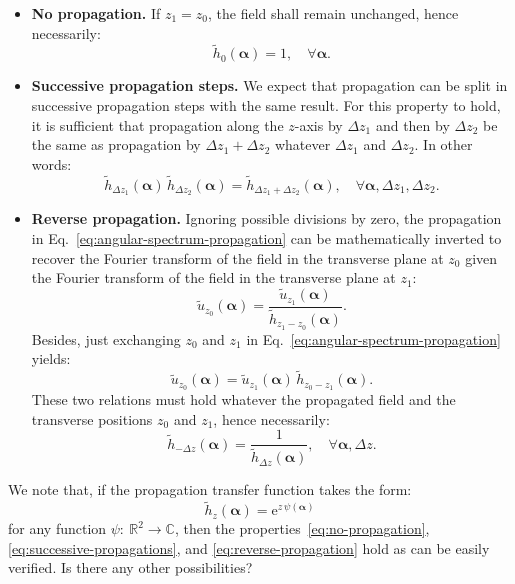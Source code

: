 \documentclass[a4paper]{article}
\newcommand{\oops}[1]{{\color{purple}#1}}
\newcommand{\V}[1]{\boldsymbol{#1}}
\newcommand*{\from}{{:}\:}
\newcommand*{\mathe}{\mathrm{e}}
\newcommand*{\FT}[1]{\widetilde{#1}}
\begin{document}
\begin{itemize}
\item \textbf{No propagation.} If $z_{1} = z_{0}$, the field shall remain
      unchanged, hence necessarily:
      \begin{equation}
        \label{eq:no-propagation}
        \FT{h}_{0}(\V{α}) = 1,\quad ∀\V{α}.
      \end{equation}

\item \textbf{Successive propagation steps.} We expect that propagation can be
      split in successive propagation steps with the same result. For this
      property to hold, it is sufficient that propagation along the $z$-axis by
      $Δz_{1}$ and then by $Δz_{2}$ be the same as propagation by
      $Δz_{1} + Δz_{2}$ whatever $Δz_{1}$ and $Δz_{2}$.
      In other words:
      \begin{equation}
        \label{eq:successive-propagations}
        \FT{h}_{Δz_{1}}(\V{α})\,
        \FT{h}_{Δz_{2}}(\V{α}) =
        \FT{h}_{Δz_{1} + Δz_{2}}(\V{α}),
        \quad ∀\V{α},Δz_{1}, Δz_{2}.
      \end{equation}

\item \textbf{Reverse propagation.} Ignoring possible divisions by zero, the
      propagation in Eq.~\eqref{eq:angular-spectrum-propagation} can be
      mathematically inverted to recover the Fourier transform of the field in
      the transverse plane at $z_{0}$ given the Fourier transform of the field
      in the transverse plane at $z_{1}$:
      \begin{displaymath}
        \FT{u}_{z_{0}}(\V{α})
        = \frac{\FT{u}_{z_{1}}(\V{α})}{\FT{h}_{z_{1} - z_{0}}(\V{α})}.
      \end{displaymath}
      Besides, just exchanging $z_{0}$ and $z_{1}$ in
      Eq.~\eqref{eq:angular-spectrum-propagation} yields:
      \begin{displaymath}
        \FT{u}_{z_{0}}(\V{α}) =
        \FT{u}_{z_{1}}(\V{α})\,\FT{h}_{z_{0} - z_{1}}(\V{α}).
      \end{displaymath}
      These two relations must hold whatever the propagated field and the
      transverse positions $z_{0}$ and $z_{1}$, hence necessarily:
      \begin{equation}
        \label{eq:reverse-propagation}
        \FT{h}_{-Δz}(\V{α})
        = \frac{1}{\FT{h}_{Δz}(\V{α})},\quad ∀\V{α},Δz.
      \end{equation}
\end{itemize}
We note that, if the propagation transfer function takes the form:
\begin{equation}
  \label{eq:exponential-form}
  \FT{h}_{z}(\V{α}) = \mathe^{z\,ψ(\V{α})}
\end{equation}
for any function $ψ \from ℝ^{2}\to ℂ$, then the
properties~\eqref{eq:no-propagation}, \eqref{eq:successive-propagations}, and
\eqref{eq:reverse-propagation} hold as can be easily verified. \oops{Is there
  any other possibilities?}
\end{document}
